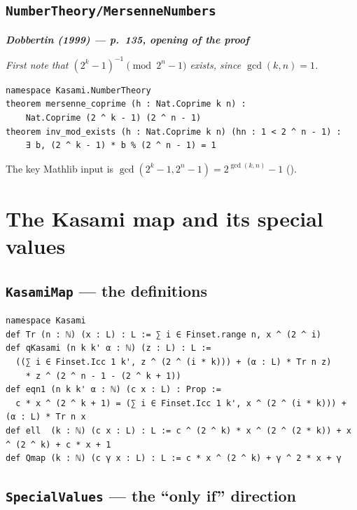 \documentclass[11pt]{article}
\newenvironment{paperquote}[1]
 {\par\smallskip\noindent
  \def\FrameCommand{\color{quotebar}\vrule width 3pt\hspace{8pt}}%
  \MakeFramed{\advance\hsize-\width \FrameRestore}%
  \small\itshape
  \noindent\normalfont\footnotesize\textbf{\textsf{Dobbertin (1999) --- #1}}\par\nobreak\smallskip\itshape}
 {\endMakeFramed\par\smallskip}
\theoremstyle{definition}
\begin{document}
\subsection{\texttt{NumberTheory/MersenneNumbers}}

\begin{paperquote}{p.~135, opening of the proof}
First note that $(2^k-1)^{-1}\pmod{2^n-1}$ exists, since $\gcd(k,n)=1$.
\end{paperquote}

\begin{lstlisting}
namespace Kasami.NumberTheory
theorem mersenne_coprime (h : Nat.Coprime k n) :
    Nat.Coprime (2 ^ k - 1) (2 ^ n - 1)
theorem inv_mod_exists (h : Nat.Coprime k n) (hn : 1 < 2 ^ n - 1) :
    ∃ b, (2 ^ k - 1) * b % (2 ^ n - 1) = 1
\end{lstlisting}

The key Mathlib input is $\gcd(2^k-1,2^n-1)=2^{\gcd(k,n)}-1$
().

\section{The Kasami map and its special values}

\subsection{\texttt{KasamiMap} --- the definitions}

\begin{lstlisting}
namespace Kasami
def Tr (n : ℕ) (x : L) : L := ∑ i ∈ Finset.range n, x ^ (2 ^ i)
def qKasami (n k k' α : ℕ) (z : L) : L :=
  ((∑ i ∈ Finset.Icc 1 k', z ^ (2 ^ (i * k))) + (α : L) * Tr n z)
    * z ^ (2 ^ n - 1 - (2 ^ k + 1))
def eqn1 (n k k' α : ℕ) (c x : L) : Prop :=
  c * x ^ (2 ^ k + 1) = (∑ i ∈ Finset.Icc 1 k', x ^ (2 ^ (i * k))) + (α : L) * Tr n x
def ell  (k : ℕ) (c x : L) : L := c ^ (2 ^ k) * x ^ (2 ^ (2 * k)) + x ^ (2 ^ k) + c * x + 1
def Qmap (k : ℕ) (c γ x : L) : L := c * x ^ (2 ^ k) + γ ^ 2 * x + γ
\end{lstlisting}

\subsection{\texttt{SpecialValues} --- the ``only if'' direction}
\end{document}
